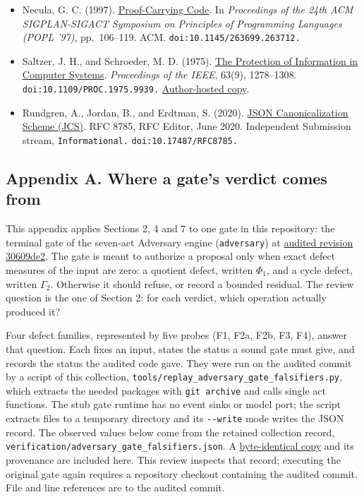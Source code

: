 \documentclass[
  11pt,
]{article}
\newcommand{\passthrough}[1]{#1}
\providecommand{\tightlist}{%
  \setlength{\itemsep}{0pt}\setlength{\parskip}{0pt}}
\begin{document}
\begin{itemize}
\tightlist
\item
  Necula, G. C. (1997).
  \href{https://doi.org/10.1145/263699.263712}{Proof-Carrying Code}. In
  \emph{Proceedings of the 24th ACM SIGPLAN-SIGACT Symposium on
  Principles of Programming Languages (POPL '97)}, pp.~106--119. ACM.
  \nolinkurl{doi:10.1145/263699.263712.}
\item
  Saltzer, J. H., and Schroeder, M. D. (1975).
  \href{https://doi.org/10.1109/PROC.1975.9939}{The Protection of
  Information in Computer Systems}. \emph{Proceedings of the IEEE},
  63(9), 1278--1308. \nolinkurl{doi:10.1109/PROC.1975.9939.}
  \href{https://web.mit.edu/Saltzer/www/publications/protection/}{Author-hosted
  copy}.
\item
  Rundgren, A., Jordan, B., and Erdtman, S. (2020).
  \href{https://www.rfc-editor.org/rfc/rfc8785}{JSON Canonicalization
  Scheme (JCS)}. RFC 8785, RFC Editor, June 2020. Independent Submission
  stream, \nolinkurl{Informational.} \nolinkurl{doi:10.17487/RFC8785.}
\end{itemize}

\subsection{Appendix A. Where a gate's verdict comes
from}\label{appendix-a.-where-a-gates-verdict-comes-from}

This appendix applies Sections 2, 4 and 7 to one gate in this
repository: the terminal gate of the seven-act Adversary engine
(\nolinkurl{adversary}) at
\href{https://github.com/dbccpage/the_symbol_game/commit/30609de2c3928238715375a9bac608256fa381d8}{audited
revision 30609de2}. The gate is meant to authorize a proposal only when
exact defect measures of the input are zero: a quotient defect, written
\(\Phi_1\), and a cycle defect, written \(\Gamma_2\). Otherwise it
should refuse, or record a bounded residual. The review question is the
one of Section 2: for each verdict, which operation actually produced
it?

Four defect families, represented by five probes (F1, F2a, F2b, F3, F4),
answer that question. Each fixes an input, states the status a sound
gate must give, and records the status the audited code gave. They were
run on the audited commit by a script of this collection,
\nolinkurl{tools/replay_adversary_gate_falsifiers.py}, which extracts the
needed packages with \passthrough{\lstinline!git archive!} and calls
single act functions. The stub gate runtime has no event sinks or model
port; the script extracts files to a temporary directory and its
\passthrough{\lstinline!--write!} mode writes the JSON record. The
observed values below come from the retained collection record,
\nolinkurl{verification/adversary_gate_falsifiers.json}. A
\href{docs/historical_evidence/adversary_gate_falsifiers.json}{byte-identical
copy} and its provenance are included here. This review inspects that
record; executing the original gate again requires a repository checkout
containing the audited commit. File and line references are to the
audited commit.
\end{document}
